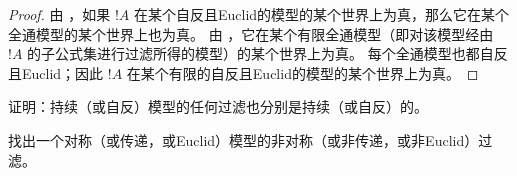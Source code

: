 \documentclass[../../../include/open-logic-section]{subfiles}
\begin{document}
\begin{proof}
  由 ，如果 $!A$ 在某个自反且Euclid的模型的某个世界上为真，那么它在某个全通模型的某个世界上也为真。
  由 ，它在某个有限全通模型（即对该模型经由 $!A$ 的子公式集进行过滤所得的模型）的某个世界上为真。
  每个全通模型也都自反且Euclid；因此 $!A$ 在某个有限的自反且Euclid的模型的某个世界上为真。
\end{proof}

\begin{prob}
  证明：持续（或自反）模型的任何过滤也分别是持续（或自反）的。
\end{prob}

\begin{prob}
  找出一个对称（或传递，或Euclid）模型的非对称（或非传递，或非Euclid）过滤。
\end{prob}
\end{document}
